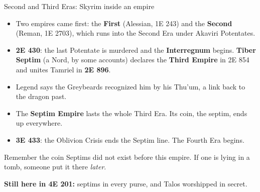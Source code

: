 \documentclass[aspectratio=169,11pt]{beamer}
\newcommand{\stillhere}[1]{\par\vfill{\small\textbf{\color{ember}Still here in 4E 201:} #1}}
\begin{document}
\begin{frame}[label=app-second]{Second and Third Eras: Skyrim inside an empire}
  \begin{itemize}
    \item Two empires came first: the \textbf{First} (Alessian, 1E 243) and the \textbf{Second} (Reman, 1E 2703), which runs into the Second Era under Akaviri Potentates.
    \item \textbf{2E 430}: the last Potentate is murdered and the \textbf{Interregnum} begins. \textbf{Tiber Septim} (a Nord, by some accounts) declares the \textbf{Third Empire} in 2E 854 and unites Tamriel in \textbf{2E 896}.
    \item Legend says the Greybeards recognized him by his Thu'um, a link back to the dragon past.
    \item The \textbf{Septim Empire} lasts the whole Third Era. Its coin, the \alert{septim}, ends up everywhere.
    \item \textbf{3E 433}: the Oblivion Crisis ends the Septim line. The Fourth Era begins.
  \end{itemize}
  \vfill
  \begin{block}{Remember the coin}
    Septims did not exist before this empire. If one is lying in a tomb, someone put it there \emph{later}.
  \end{block}
  \stillhere{septims in every purse, and Talos worshipped in secret.}
\end{frame}
\end{document}
